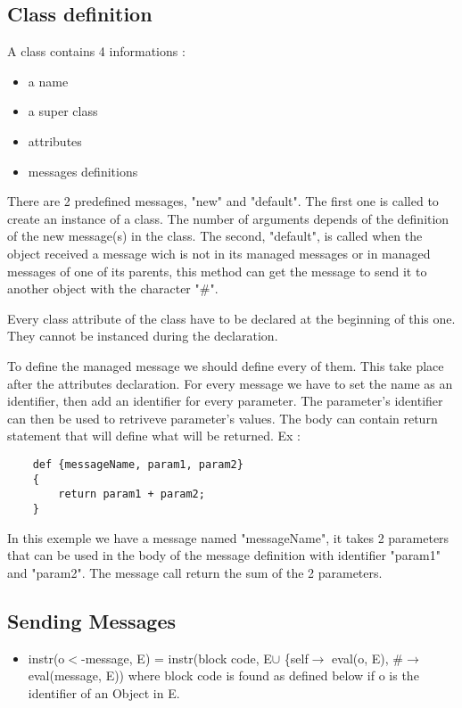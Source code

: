 \documentclass{eplDoc}
\begin{document}
\subsection{Class definition}
A class contains 4 informations : 
\begin{itemize}
    \item a name
    \item a super class
    \item attributes 
    \item messages definitions
\end{itemize}

There are 2 predefined messages, "new" and "default".  The first one is called 
to create an instance of a class.  The number of arguments depends of the 
definition of the new message(s) in the class.  The second, "default", is called
when the object received a message wich is not in its managed messages or in 
managed messages of one of its parents, this method can get the message to send 
it to another object with the character "\#". 


Every class attribute of the class have to be declared at the beginning of this one.  
They cannot be instanced during the declaration.

To define the managed message we should define every of them.  This take place after the attributes declaration.  For every message we have to set the name as an identifier, then add an identifier for every parameter. The parameter's identifier can then be used to retriveve parameter's values. 
The body can contain return statement that will define what will be returned.
Ex : 
\begin{lstlisting}
    def {messageName, param1, param2}
    {
        return param1 + param2;
    }
\end{lstlisting}
In this exemple we have a message named "messageName", it takes 2 parameters that can be used in the body of the message definition with identifier "param1" and "param2".  The message call return the sum of the 2 parameters.


\subsection{Sending Messages}

\begin{itemize}
	\item instr(o$<$-message, E) = instr(block code, E$\cup$ \{self$\rightarrow$ eval(o, E), \#$\rightarrow$ eval(message, E)) where block code is found as defined below if o is the identifier of an Object in E. 
\end{itemize}
\end{document}
